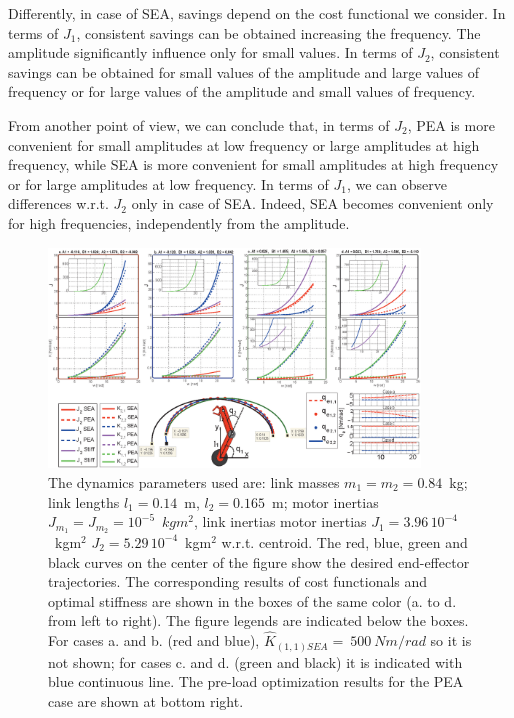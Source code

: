 Differently, in case of SEA, savings depend on the cost functional we consider. In terms of $J_1$, consistent savings can be obtained increasing the frequency. The amplitude significantly influence only for small values. In terms of $J_2$, consistent savings can be obtained for small values of the amplitude and large values of frequency or for large values of the amplitude and small values of frequency. 

From another point of view, we can conclude that, in terms of $J_2$, PEA is more convenient for small amplitudes at low frequency or large amplitudes at high frequency, while SEA is more convenient for small amplitudes at high frequency or for large amplitudes at low frequency. In terms of $J_1$, we can observe differences w.r.t. $J_2$ only in case of SEA. Indeed, SEA becomes convenient only for high frequencies, independently from the amplitude.
\begin{figure}[!t]
\centering
\includegraphics[width=0.88\textwidth]{dwg/TwoLinksManipulator}
\caption{The dynamics parameters used are: link masses $m_1 = m_2 = 0.84$~kg; link lengths $l_1 = 0.14$~m, $l_2 = 0.165$~m; motor inertias $J_{m_{1}} = J_{m_{2}} = 10^{-5}$~$kg m^2$, link inertias motor inertias $J_1 = 3.96\,10^{-4}$~kgm$^2$ $J_2 = 5.29\,10^{-4}$~kgm$^2$ w.r.t. centroid. The red, blue, green and black curves on the center of the figure show the desired end-effector trajectories. The corresponding results of cost functionals and optimal stiffness are shown in the boxes of the same color (a. to d. from left to right). The figure legends are indicated below the boxes. For cases a. and b. (red and blue), $\hat K_{(1,1)SEA} = \ 500 \ Nm/rad$ so it is not shown; for cases c. and d. (green and black) it is indicated with blue continuous line. The pre-load optimization results for the PEA case are shown at bottom right.}
\label{fig:PickAndPlace}
\end{figure}

